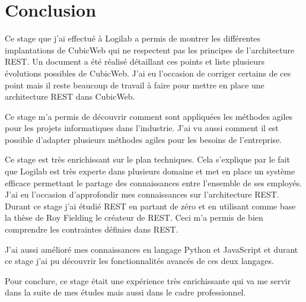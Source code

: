 \chapter*{Conclusion}
Ce stage que j'ai effectué à Logilab a permis de montrer les différentes implantations de CubicWeb qui ne respectent pas les principes de l'architecture REST. Un document a été réalisé détaillant ces points et liste plusieurs évolutions possibles de CubicWeb. J'ai eu l'occasion de corriger certains de ces point mais il reste beaucoup de travail à faire pour mettre en place une architecture REST dans CubicWeb.     

Ce stage m'a permis de découvrir comment sont appliquées les méthodes agiles pour les projets informatiques
dans l'industrie. J'ai vu aussi comment il est possible d'adapter plusieurs méthodes agiles pour les besoins de l'entreprise.

Ce stage est très enrichissant sur le plan techniques. Cela s'explique par le fait que Logilab est très experte dans plusieurs domaine et met en place un système efficace permettant le partage des connaissances entre l'ensemble de ses employés. J'ai eu l'occasion d'approfondir mes connaissances sur l'architecture REST. Durant ce stage j'ai étudié REST en partant de zéro et en utilisant comme base la thèse de Roy Fielding le créateur de REST. Ceci m'a permis de bien comprendre les contraintes définies dans REST. 

J'ai aussi amélioré mes connaissances en langage Python et JavaScript et durant ce stage j'ai pu découvrir les fonctionnalités avancés de ces deux langages. 

Pour conclure, ce stage était une expérience très enrichissante qui va me servir dans la suite de mes études mais aussi dans le cadre professionnel.
